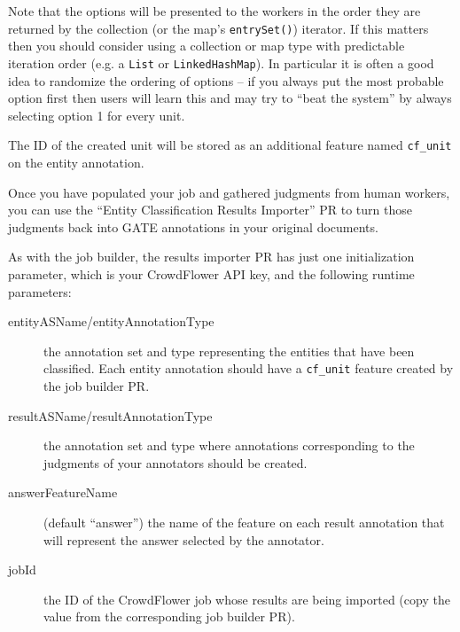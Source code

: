 \begin{description}
\end{description}

Note that the options will be presented to the workers in the order they are
returned by the collection (or the map's \verb!entrySet()!) iterator.
If this matters then you should consider using a collection or map type with
predictable iteration order (e.g. a \verb!List! or \verb!LinkedHashMap!).  In
particular it is often a good idea to randomize the ordering of options -- if
you always put the most probable option first then users will learn this and
may try to ``beat the system'' by always selecting option 1 for every unit.

The ID of the created unit will be stored as an additional feature named
\verb!cf_unit! on the entity annotation.


Once you have populated your job and gathered judgments from human workers, you
can use the ``Entity Classification Results Importer'' PR to turn those
judgments back into GATE annotations in your original documents.

As with the job builder, the results importer PR has just one initialization
parameter, which is your CrowdFlower API key, and the following runtime
parameters:
\begin{description}
\item[entityASName/entityAnnotationType] the annotation set and type
  representing the entities that have been classified.  Each entity annotation
  should have a \verb!cf_unit! feature created by the job builder PR.
\item[resultASName/resultAnnotationType] the annotation set and type where
  annotations corresponding to the judgments of your annotators should be
  created.
\item[answerFeatureName] (default ``answer'') the name of the feature on each
  result annotation that will represent the answer selected by the annotator.
\item[jobId] the ID of the CrowdFlower job whose results are being imported
  (copy the value from the corresponding job builder PR).
\end{description}

